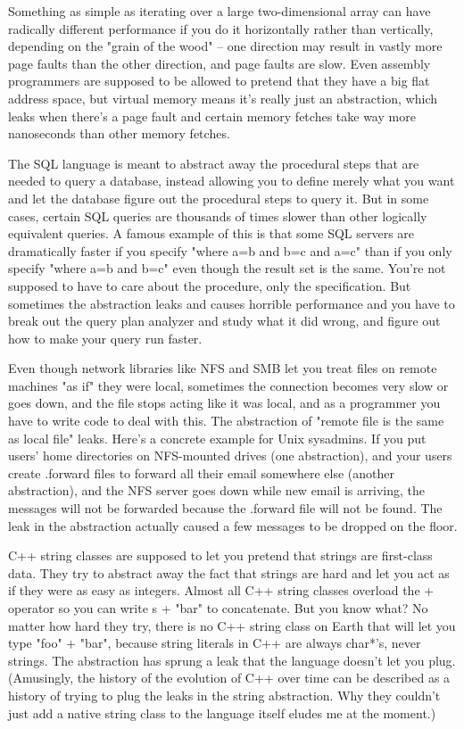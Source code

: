 \documentclass{article}
\begin{document}
\begin{compactitem}
\item Something as simple as iterating over a large two-dimensional array can have radically different performance if you do it horizontally rather than vertically, depending on the "grain of the wood" -- one direction may result in vastly more page faults than the other direction, and page faults are slow. Even assembly programmers are supposed to be allowed to pretend that they have a big flat address space, but virtual memory means it's really just an abstraction, which leaks when there's a page fault and certain memory fetches take way more nanoseconds than other memory fetches.
\item The SQL language is meant to abstract away the procedural steps that are needed to query a database, instead allowing you to define merely what you want and let the database figure out the procedural steps to query it. But in some cases, certain SQL queries are thousands of times slower than other logically equivalent queries. A famous example of this is that some SQL servers are dramatically faster if you specify "where a=b and b=c and a=c" than if you only specify "where a=b and b=c" even though the result set is the same. You're not supposed to have to care about the procedure, only the specification. But sometimes the abstraction leaks and causes horrible performance and you have to break out the query plan analyzer and study what it did wrong, and figure out how to make your query run faster.
\item Even though network libraries like NFS and SMB let you treat files on remote machines "as if" they were local, sometimes the connection becomes very slow or goes down, and the file stops acting like it was local, and as a programmer you have to write code to deal with this. The abstraction of "remote file is the same as local file" leaks. Here's a concrete example for Unix sysadmins. If you put users' home directories on NFS-mounted drives (one abstraction), and your users create .forward files to forward all their email somewhere else (another abstraction), and the NFS server goes down while new email is arriving, the messages will not be forwarded because the .forward file will not be found. The leak in the abstraction actually caused a few messages to be dropped on the floor.
\item C++ string classes are supposed to let you pretend that strings are first-class data. They try to abstract away the fact that strings are hard and let you act as if they were as easy as integers. Almost all C++ string classes overload the + operator so you can write s + "bar" to concatenate. But you know what? No matter how hard they try, there is no C++ string class on Earth that will let you type "foo" + "bar", because string literals in C++ are always char*'s, never strings. The abstraction has sprung a leak that the language doesn't let you plug. (Amusingly, the history of the evolution of C++ over time can be described as a history of trying to plug the leaks in the string abstraction. Why they couldn't just add a native string class to the language itself eludes me at the moment.)

\end{compactitem}
\end{document}
